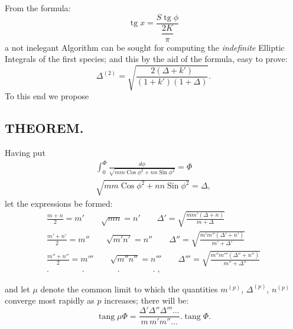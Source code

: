 \documentclass{article}
\begin{document}
From the formula:
\[
\operatorname{tg}x=\frac{S\operatorname{tg}\phi}{\dfrac{2K}{\pi}}
\]
a not inelegant Algorithm can be sought for computing the \emph{indefinite} Elliptic Integrals of the first species; and this by the aid of the formula, easy to prove:
\[
\Delta^{(2)}=\sqrt{\frac{2(\Delta+k')}{(1+k')(1+\Delta)}}.
\]
To this end we propose

\subsection*{THEOREM.}

Having put
\[
\begin{gathered}
\int_{0}^{\Phi}\frac{d\phi}{\sqrt{mm\operatorname{Cos}\phi^{2}+nn\operatorname{Sin}\phi^{2}}}=\Phi\\[1.5ex]
\sqrt{mm\operatorname{Cos}\phi^{2}+nn\operatorname{Sin}\phi^{2}}=\Delta,
\end{gathered}
\]
let the expressions be formed:
\[
\begin{gathered}
\frac{m+n}{2}=m'\qquad\sqrt{mn}=n'\qquad\Delta'=\sqrt{\frac{mm'(\Delta+n)}{m+\Delta}}\\[1.5ex]
\frac{m'+n'}{2}=m''\qquad\sqrt{m'n'}=n''\qquad\Delta''=\sqrt{\frac{m'm''(\Delta'+n')}{m'+\Delta'}}\\[1.5ex]
\frac{m''+n''}{2}=m'''\qquad\sqrt{m''n''}=n'''\qquad\Delta'''=\sqrt{\frac{m''m'''(\Delta''+n'')}{m''+\Delta''}}\\[1.5ex]
.\qquad\qquad.\qquad\qquad.\qquad\qquad.\;,
\end{gathered}
\]

and let $\mu$ denote the common limit to which the quantities $m^{(p)}$, $\Delta^{(p)}$, $n^{(p)}$ converge most rapidly as $p$ increases; there will be:
\[
\operatorname{tang}\mu\Phi=\frac{\Delta'\Delta''\Delta'''\ldots}{m\,m'm''\ldots}.\operatorname{tang}\Phi.
\]
\end{document}

